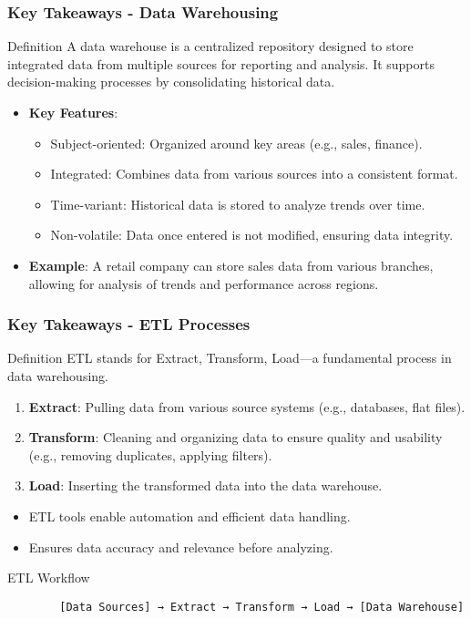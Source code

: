 \documentclass{beamer}
\begin{document}
\begin{frame}[fragile]
    \frametitle{Key Takeaways - Data Warehousing}
    \begin{block}{Definition}
        A data warehouse is a centralized repository designed to store integrated data from multiple sources for reporting and analysis. It supports decision-making processes by consolidating historical data.
    \end{block}
    \begin{itemize}
        \item \textbf{Key Features}:
        \begin{itemize}
            \item Subject-oriented: Organized around key areas (e.g., sales, finance).
            \item Integrated: Combines data from various sources into a consistent format.
            \item Time-variant: Historical data is stored to analyze trends over time.
            \item Non-volatile: Data once entered is not modified, ensuring data integrity.
        \end{itemize}
        \item \textbf{Example}: A retail company can store sales data from various branches, allowing for analysis of trends and performance across regions.
    \end{itemize}
\end{frame}

\begin{frame}[fragile]
    \frametitle{Key Takeaways - ETL Processes}
    \begin{block}{Definition}
        ETL stands for Extract, Transform, Load—a fundamental process in data warehousing.
    \end{block}
    \begin{enumerate}
        \item \textbf{Extract}: Pulling data from various source systems (e.g., databases, flat files).
        \item \textbf{Transform}: Cleaning and organizing data to ensure quality and usability (e.g., removing duplicates, applying filters).
        \item \textbf{Load}: Inserting the transformed data into the data warehouse.
    \end{enumerate}
    \begin{itemize}
        \item ETL tools enable automation and efficient data handling.
        \item Ensures data accuracy and relevance before analyzing.
    \end{itemize}
    \begin{block}{ETL Workflow}
        \begin{lstlisting}
        [Data Sources] → Extract → Transform → Load → [Data Warehouse]
        \end{lstlisting}
    \end{block}
\end{frame}
\end{document}
